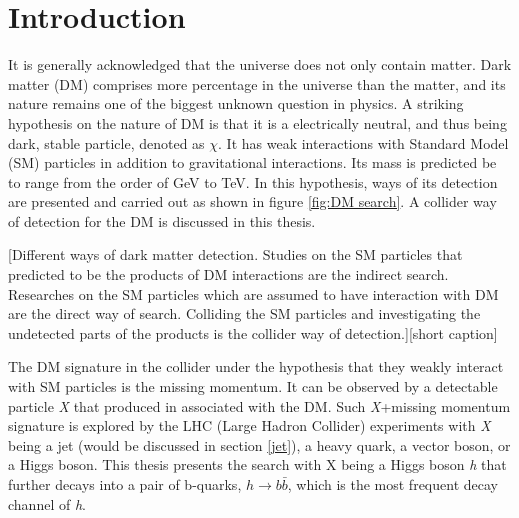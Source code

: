\documentclass[class=NCU_thesis, crop=false]{standalone}
\begin{document}
\chapter{Introduction}
It is generally acknowledged that the universe does not only contain matter. Dark matter (DM) comprises more percentage in the universe than the matter, and its nature remains one of the biggest unknown question in physics. A striking hypothesis on the nature of DM is that it is a electrically neutral, and thus being dark, stable particle, denoted as $\chi$. It has weak interactions with Standard Model (SM) particles in addition to gravitational interactions. Its mass is predicted be to range from the order of GeV to TeV. In this hypothesis, ways of its detection are presented and carried out as shown in figure \ref{fig:DM search}. A collider way of detection for the DM is discussed in this thesis.

[Different ways of dark matter detection. Studies on the SM particles that predicted to be the products of DM interactions are the indirect search. Researches on the SM particles which are assumed to have interaction with DM are the direct way of search. Colliding the SM particles and investigating the undetected parts of the products is the collider way of detection.][short caption]

\newpage

The DM signature in the collider under the hypothesis that they weakly interact with SM particles is the missing momentum. It can be observed by a detectable particle \textit{X} that produced in associated with the DM. Such \textit{X}+missing momentum signature is explored by the LHC (Large Hadron Collider) experiments with \textit{X} being a jet (would be discussed in section \ref{jet}), a heavy quark, a vector boson, or a Higgs boson. This thesis presents the search with X being a Higgs boson \textit{h} that further decays into a pair of b-quarks, $h \rightarrow b\bar{b}$, which is the most frequent decay channel of \textit{h}.
\end{document}
